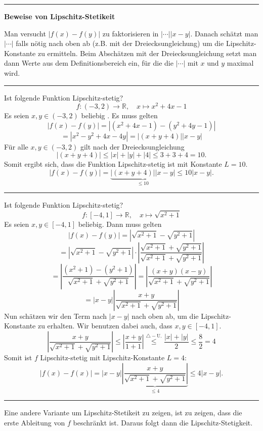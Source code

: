 \documentclass[a4paper,landscape,8pt]{extarticle}
\newcommand{\R}{\mathbb{R}}
\newcommand{\abs}[1]{\left\lvert #1 \right\rvert}
\newcommand{\sep}{\vspace{5pt}\noindent\hrule\vspace{5pt}}
\begin{document}
\begin{multicols*}{4}
\begin{warmup}
\sep
\end{warmup}

\textbf{Beweise von Lipschitz-Stetikeit}

\Vorgehen Man versucht $\abs{f(x)-f(y)}$ zu faktorisieren in
$\abs{\cdots}\abs{x-y}$. Danach schätzt man $\abs{\cdots}$ falls nötig nach oben
ab (z.B. mit der Dreiecksungleichung) um die Lipschitz-Konstante zu ermitteln.
Beim Abschätzen mit der Dreiecksungleichung setzt man dann Werte aus dem
Definitionsbereich ein, für die die $\abs{\cdots}$ mit $x$ und $y$ maximal wird.

\begin{warmup}
\sep

\Bsp Ist folgende Funktion Lipschitz-stetig?
\[
f\colon (-3,2)\to\R, \quad x\mapsto x^2+4x-1
\]
Es seien $x,y\in(-3,2)$ beliebig . Es muss gelten
\[
\abs{f(x)-f(y)} =
\abs{(x^2+4x-1) - (y^2+4y -1)}
\]
\[
=\abs{x^2-y^2+4x-4y}=\abs{(x+y+4)}\abs{x-y}
\]
Für alle $x,y\in(-3,2)$ gilt nach der Dreiecksungleichung
\[
\abs{(x+y+4)} \leq \abs{x} + \abs{y} + \abs{4} \leq 3 +3 +4 = 10.
\]
Somit ergibt sich, dass die Funktion Lipschitz-stetig ist mit Konstante $L=10$.
\[
\abs{f(x)-f(y)} = \underbrace{\abs{(x+y+4)}\abs{x-y}}_{\leq 10} \leq
10\abs{x-y}.
\]

\sep

\Bsp Ist folgende Funktion Lipschitz-stetig?
\[
f\colon [-4,1] \to \R,\quad
x \mapsto \sqrt{x^2+1}
\]
Es seien $x,y\in[-4,1]$ beliebig. Dann muss gelten
\[
\abs{f(x)-f(y)}=\abs{\sqrt{x^2+1}-\sqrt{y^2+1}}
\]
\[
=\abs{\sqrt{x^2+1}-\sqrt{y^2+1}}
\cdot\abs{\frac{\sqrt{x^2+1}+\sqrt{y^2+1}}{\sqrt{x^2+1}+\sqrt{y^2+1}}}
\]
\[
=\abs{\frac{(x^2+1)-(y^2+1)}{\sqrt{x^2+1}+\sqrt{y^2+1}}}
=\abs{\frac{(x+y)(x-y)}{\sqrt{x^2+1}+\sqrt{y^2+1}}}
\]
\[
=\abs{x-y}\abs{\frac{x+y}{\sqrt{x^2+1}+\sqrt{y^2+1}}}
\]
Nun schätzen wir den Term nach $\abs{x-y}$ nach oben ab, um die
Lipschitz-Konstante zu erhalten. Wir benutzen dabei auch, dass $x,y\in[-4,1]$.
\[
\abs{\frac{x+y}{\sqrt{x^2+1}+\sqrt{y^2+1}}}
\leq
\abs{\frac{x+y}{1+1}}
\stackrel{\triangle-\text{U.}}{\leq}
\frac{\abs{x}+\abs{y}}{2}
\leq
\frac{8}{2} = 4
\]
Somit ist $f$ Lipschitz-stetig mit Lipschitz-Konstante $L=4$:
\[
\abs{f(x)-f(x)}
=\abs{x-y}\underbrace{\abs{\frac{x+y}{\sqrt{x^2+1}+\sqrt{y^2+1}}}}_{\leq 4}
\leq 4 \abs{x-y}.
\]

\sep
\end{warmup}

\Vorgehen Eine andere Variante um Lipschitz-Stetikeit zu zeigen, ist zu zeigen,
dass die erste Ableitung von $f$ beschränkt ist. Daraus folgt dann die
Lipschitz-Stetigkeit.


\end{multicols*}
\end{document}
